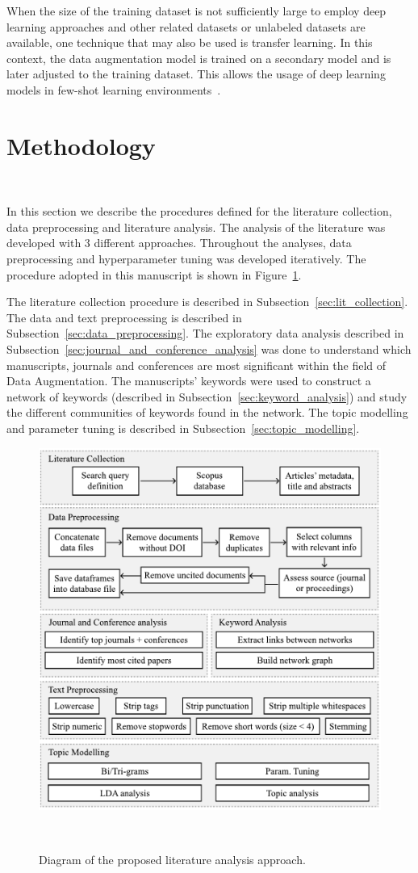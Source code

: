 \documentclass[parskip=full]{scrartcl}
\begin{document}
When the size of the training dataset is not sufficiently large to employ deep
learning approaches and other related datasets or unlabeled datasets are
available, one technique that may also be used is transfer learning. In this
context, the data augmentation model is trained on a secondary model and is
later adjusted to the training dataset. This allows the usage of deep learning
models in few-shot learning environments~\cite{Antoniou2017}.

\section{Methodology}~\label{sec:methodology}

In this section we describe the procedures defined for the literature
collection, data preprocessing and literature analysis. The analysis of the
literature was developed with 3 different approaches. Throughout the
analyses, data preprocessing and hyperparameter tuning was developed
iteratively. The procedure adopted in this manuscript is shown in
Figure~\ref{fig:slr_diagram}.

The literature collection procedure is described in
Subsection~\ref{sec:lit_collection}. The data and text preprocessing is
described in Subsection~\ref{sec:data_preprocessing}. The exploratory data
analysis described in Subsection~\ref{sec:journal_and_conference_analysis} was
done to understand which manuscripts, journals and conferences are most
significant within the field of Data Augmentation. The manuscripts' keywords
were used to construct a network of keywords (described in
Subsection~\ref{sec:keyword_analysis}) and study the different communities of
keywords found in the network. The topic modelling and parameter tuning is
described in Subsection~\ref{sec:topic_modelling}. 

\begin{figure}[H]
	\centering
	\includegraphics[width=.85\linewidth]{../analysis/slr_diagram}
    \caption{Diagram of the proposed literature analysis approach.
    }~\label{fig:slr_diagram}
\end{figure}
\end{document}
